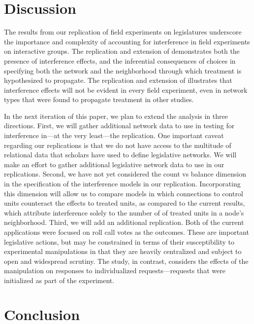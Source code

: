 \documentclass[12pt]{article}
\begin{document}
\section{Discussion}
The results from our replication of field experiments on legislatures underscore the importance and complexity of accounting for interference in field experiments on interactive groups. The replication and extension of \citet{coppock2014information} demonstrates both the presence of interference effects, and the inferential consequences of choices in specifying both the network and the neighborhood through which treatment is hypothesized to propagate. The replication and extension of \citet{bergan2015call} illustrates that interference effects will not be evident in every field experiment, even in network types that were found to propagate treatment in other studies.

In the next iteration of this paper, we plan to extend the analysis in three directions. First, we will gather additional network data to use in testing for interference in---at the very least---the \citet{bergan2015call} replication. One important caveat regarding our replications is that we do not have access to the multitude of relational data that scholars have used to define legislative networks. We will make an effort to gather additional legislative network data to use in our replications. Second, we have not yet considered the count vs balance dimension in the specification of the interference models in our replication. Incorporating this dimension will allow us to compare models in which connections to control units counteract the effects to treated units, as compared to the current results, which attribute interference solely to the number of of treated units in a node's neighborhood. Third, we will add an additional replication. Both of the current applications were focused on roll call votes as the outcomes. These are important legislative actions, but may be constrained in terms of their susceptibility to experimental manipulations in that they are heavily centralized and subject to open and widespread scrutiny. The \citet{broockman2013black} study, in contrast, considers the effects of the manipulation on responses to individualized requests---requests that were initialized as part of the experiment. 


\section{Conclusion}
\end{document}
